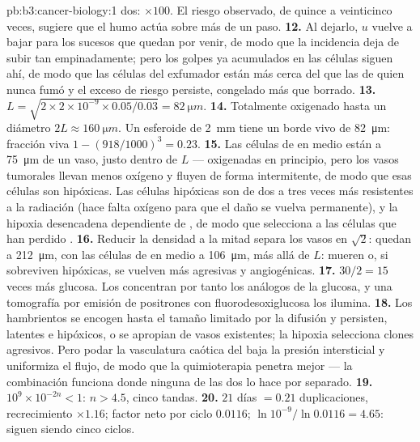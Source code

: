 \begin{solution}{pb:b3:cancer-biology:1}
dos: $\times 100$. El riesgo observado, de quince a veinticinco veces,
sugiere que el humo actúa sobre más de un paso.
\textbf{12.} Al dejarlo, $u$ vuelve a bajar para los sucesos que quedan
por venir, de modo que la incidencia deja de subir tan empinadamente;
pero los golpes ya acumulados en las células siguen ahí, de modo que las
células del exfumador están más cerca del  que las de quien nunca
fumó y el exceso de riesgo persiste, congelado más que borrado.
\textbf{13.} $L = \sqrt{2\times 2\times 10^{-9}\times 0.05/0.03} =
\qty{82}{\micro m}$.
\textbf{14.} Totalmente oxigenado hasta un diámetro $2L \approx
\qty{160}{\micro m}$. Un esferoide de \qty{2}{mm} tiene un borde vivo de
\qty{82}{\micro m}: fracción viva $1 - (918/1000)^{3} = 0.23$.
\textbf{15.} Las células de en medio están a \qty{75}{\micro m} de un
vaso, justo dentro de $L$ --- oxigenadas en principio, pero los vasos
tumorales llevan menos oxígeno y fluyen de forma intermitente, de modo
que esas células son hipóxicas. Las células hipóxicas son de dos a tres
veces más resistentes a la radiación (hace falta oxígeno para que el daño
se vuelva permanente), y la hipoxia desencadena  dependiente de
, de modo que selecciona a las células que han perdido .
\textbf{16.} Reducir la densidad a la mitad separa los vasos en
$\sqrt{2}$: quedan a \qty{212}{\micro m}, con las células de en medio a
\qty{106}{\micro m}, más allá de $L$: mueren o, si sobreviven hipóxicas,
se vuelven más agresivas y angiogénicas.
\textbf{17.} $30/2 = 15$ veces más glucosa. Los  concentran por
tanto los análogos de la glucosa, y una tomografía por emisión de
positrones con fluorodesoxiglucosa los ilumina.
\textbf{18.} Los  hambrientos se encogen hasta el tamaño limitado
por la difusión y persisten, latentes e hipóxicos, o se apropian de vasos
existentes; la hipoxia selecciona clones agresivos. Pero podar la
vasculatura caótica del  baja la presión intersticial y uniformiza
el flujo, de modo que la quimioterapia penetra mejor --- la combinación
funciona donde ninguna de las dos lo hace por separado.
\textbf{19.} $10^{9}\times 10^{-2n} < 1$: $n > 4.5$, cinco tandas.
\textbf{20.} $21$ días $= 0.21$ duplicaciones, recrecimiento
$\times 1.16$; factor neto por ciclo $0.0116$;
$\ln 10^{-9}/\ln 0.0116 = 4.65$: siguen siendo cinco ciclos.

\end{solution}
